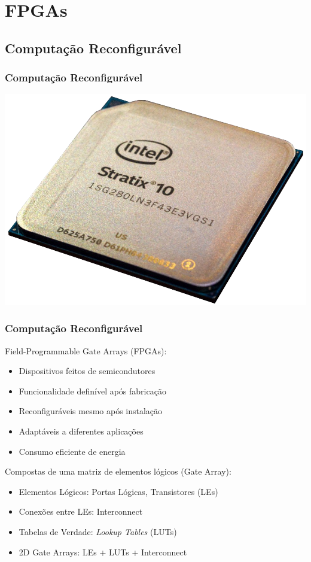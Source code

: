 \documentclass[10pt, compress]{beamer}
\begin{document}
\section{FPGAs}

\subsection{Computação Reconfigurável}

\begin{frame}
    \frametitle{Computação Reconfigurável}
    \begin{center}
        \includegraphics[width=.65\textwidth]{stratix10}
    \end{center}
\end{frame}

\begin{frame}
    \frametitle{Computação Reconfigurável}
    \alert{Field-Programmable} Gate Arrays (FPGAs):

    \begin{itemize}
        \item Dispositivos feitos de semicondutores
        \item Funcionalidade definível após fabricação
        \item \alert{Reconfiguráveis} mesmo após instalação
        \item Adaptáveis a diferentes aplicações
        \item \alert{Consumo eficiente de energia}
    \end{itemize}

    \pause
    Compostas de uma matriz de elementos lógicos (\alert{Gate Array}):

    \begin{itemize}
        \item Elementos Lógicos: Portas Lógicas, Transistores (\alert{LEs})
        \item Conexões entre LEs: \alert{Interconnect}
        \item Tabelas de Verdade: \textit{Lookup Tables} (\alert{LUTs})
        \item 2D Gate Arrays: \alert{LEs} + \alert{LUTs} + \alert{Interconnect}
    \end{itemize}
\end{frame}
\end{document}
